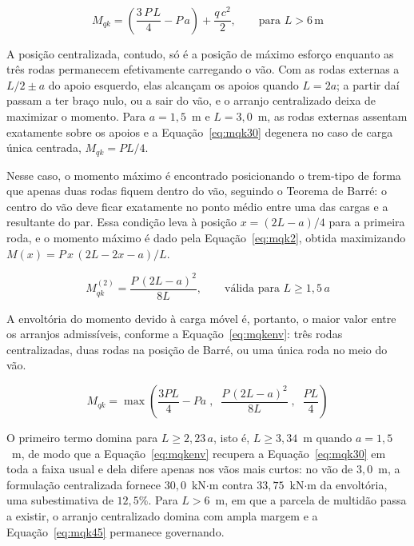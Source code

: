 \begin{equation}
M_{qk} = \left(\frac{3\,P\,L}{4} - P\,a\right) + \frac{q\,c^2}{2}, \qquad \text{para } L > 6\,\text{m}
\label{eq:mqk45}
\end{equation}

A posição centralizada, contudo, só é a posição de máximo esforço enquanto as três rodas permanecem efetivamente carregando o vão. Com as rodas externas a $L/2 \pm a$ do apoio esquerdo, elas alcançam os apoios quando $L = 2a$; a partir daí passam a ter braço nulo, ou a sair do vão, e o arranjo centralizado deixa de maximizar o momento. Para $a = 1{,}5$~m e $L = 3{,}0$~m, as rodas externas assentam exatamente sobre os apoios e a Equação~\eqref{eq:mqk30} degenera no caso de carga única centrada, $M_{qk} = PL/4$.

Nesse caso, o momento máximo é encontrado posicionando o trem-tipo de forma que apenas duas rodas fiquem dentro do vão, seguindo o Teorema de Barré: o centro do vão deve ficar exatamente no ponto médio entre uma das cargas e a resultante do par. Essa condição leva à posição $x = (2L-a)/4$ para a primeira roda, e o momento máximo é dado pela Equação~\eqref{eq:mqk2}, obtida maximizando $M(x) = P\,x\,(2L - 2x - a)/L$.

\begin{equation}
M_{qk}^{(2)} = \frac{P\,(2L-a)^2}{8L}, \qquad \text{válida para } L \geq 1{,}5\,a
\label{eq:mqk2}
\end{equation}

A envoltória do momento devido à carga móvel é, portanto, o maior valor entre os arranjos admissíveis, conforme a Equação~\eqref{eq:mqkenv}: três rodas centralizadas, duas rodas na posição de Barré, ou uma única roda no meio do vão.

\begin{equation}
M_{qk} = \max\left(\frac{3PL}{4} - Pa\;,\;\; \frac{P\,(2L-a)^2}{8L}\;,\;\; \frac{PL}{4}\right)
\label{eq:mqkenv}
\end{equation}

O primeiro termo domina para $L \geq 2{,}23\,a$, isto é, $L \geq 3{,}34$~m quando $a = 1{,}5$~m, de modo que a Equação~\eqref{eq:mqkenv} recupera a Equação~\eqref{eq:mqk30} em toda a faixa usual e dela difere apenas nos vãos mais curtos: no vão de $3{,}0$~m, a formulação centralizada fornece $30{,}0$~kN$\cdot$m contra $33{,}75$~kN$\cdot$m da envoltória, uma subestimativa de $12{,}5\%$. Para $L > 6$~m, em que a parcela de multidão passa a existir, o arranjo centralizado domina com ampla margem e a Equação~\eqref{eq:mqk45} permanece governando.

